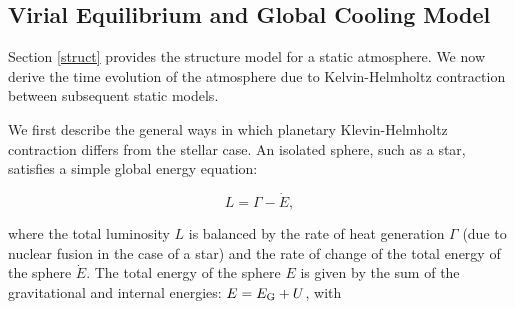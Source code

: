 \documentclass[apj]{emulateapj}
\begin{document}




\subsection{Virial Equilibrium and Global Cooling Model}
\label{cooling}

Section \ref{struct} provides the structure model for a static atmosphere. We now derive the time evolution of the atmosphere due to Kelvin-Helmholtz contraction between subsequent static models. 

We first describe the general ways in which planetary Klevin-Helmholtz contraction differs from the stellar case. An isolated sphere, such as a star, satisfies a simple global energy equation:

\begin{equation}
\label{eq:coolingstar}
L=\Gamma - \dot{E},
\end{equation}

\noindent where the total luminosity $L$ is balanced by the rate of heat generation $\Gamma$ (due to nuclear fusion in the case of a star) and the rate of change of the total energy of the sphere $\dot{E}$. The total energy of the sphere $E$ is given by the sum of the gravitational and internal energies: $E=E_{\rm G}+U$, with 
\end{document}
